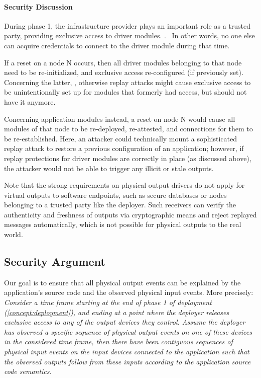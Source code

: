 \paragraph{Security Discussion}
\label{concept:security-discussion}
%
During phase 1, the infrastructure provider plays an important role as a trusted
party, providing exclusive access to driver
modules. .~ In other words, no one else can acquire credentials to
connect to the driver module during that time.

If a reset on a node N occurs, then all driver modules belonging to that node
need to be re-initialized, and exclusive access re-configured (if previously
set). Concerning the latter, , otherwise replay attacks might cause exclusive access
to be unintentionally set up for modules that formerly had access, but should
not have it anymore.

Concerning application modules instead, a reset on node N would cause all
modules of that node to be re-deployed, re-attested, and connections for them to
be re-established. Here, an attacker could technically mount a sophisticated
replay attack to restore a previous configuration of an application; however, if
replay protections for driver modules are correctly in place (as discussed
above), the attacker would not be able to trigger any illicit or stale outputs. 

Note that the strong requirements on physical output drivers do not apply for
virtual outputs to software endpoints, such as secure databases or nodes
belonging to a trusted party like the deployer. Such receivers can verify the
authenticity and freshness of outputs via cryptographic means and reject
replayed messages automatically, which is not possible for physical outputs to
the real world.

\subsection{Security Argument}
%
Our goal is to ensure that all physical output events can be explained by the
application's source code and the observed physical input events. More
precisely:
%
\label{concept:security-property} %
%
\emph{ Consider a time frame starting at the end of phase 1 of deployment
  (\cref{concept:deployment}), and ending at a point where the deployer releases
  exclusive access to any of the output devices they control. Assume the
  deployer has observed a specific sequence of physical output events on one of
  these devices  in the considered time frame, then there have been
  contiguous sequences of physical input events on the input devices connected
  to the application such that the observed outputs follow from these inputs
  according to the application source code semantics.}

